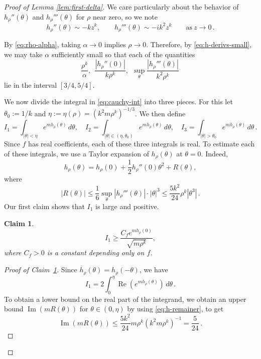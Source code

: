 \documentclass{daj}
\def\t{\theta}
\renewcommand{\Re}{\operatorname{Re}}
\renewcommand{\Im}{\operatorname{Im}}
\newtheorem{claim}[theorem]{Claim}
\theoremstyle{definition}
\theoremstyle{remark}
\begin{document}
\begin{proof}[Proof of Lemma \ref{lem:first-delta}]
	We care particularly about the behavior of $h_\rho''(\theta)$ and $h_\rho'''(\theta)$ for $\rho$ near zero, so we note \begin{equation} \label{eq:h-derivs-small}
	h_\rho''(\theta) \sim - k z^k,\qquad h_\rho'''(\theta) \sim -i k^2 z^k\qquad \mathrm{as}\ z \to 0\,.
	\end{equation}	
	
	By \eqref{eq:rho-alpha}, taking $\alpha \to 0$ implies $\rho \to 0$.  Therefore, by \eqref{eq:h-derivs-small}, we may take $\alpha$ sufficiently small so that each of 
	the quantities
	\begin{equation}\label{eq:h-derivs-bounds} 
	 \frac{\rho^k}{\alpha},\ \ \frac{|h_\rho''(0)|}{k \rho^k}, \ \ \sup_{\theta} \frac{|h_\rho'''(\theta)|}{k^2 \rho^k}\,
	\end{equation} lie in the interval $[3/4,5/4]$.
	

We now divide the integral in \eqref{eq:cauchy-int} into three pieces. For this let $\theta_0 := 1/k$ and $\eta := \eta(\rho) = (k^2 m \rho^k)^{-1/3}$. 
We then define 
	\begin{equation}
	I_1 = \int_{|\theta| < \eta} e^{m h_\rho(\theta)}\,d\theta,\quad I_2 = \int_{|\theta| \in (\eta,\theta_0)} e^{m h_\rho(\theta)}\,d\theta,\quad I_3 = \int_{|\theta| > \theta_0} e^{m h_\rho(\theta)}\,d\theta\,.
	\end{equation}  Since $f$ has real coefficients, each of these three integrals is real. 
To estimate each of these integrals, we use a Taylor expansion of $h_{\rho}(\t)$ at $\t = 0$. Indeed,
	 \begin{equation}\label{eq:h-taylor} h_\rho(\theta) = h_\rho(0) + \frac{1}{2}h_\rho''(0) \theta^2 + R(\theta) , \end{equation}
	where \begin{equation} \label{eq:h-remainer} |R(\theta)| \leq \frac{1}{6} \sup_{\theta} |h_\rho'''(\theta)| \cdot |\theta|^3 \leq  \frac{5 k^2 }{24} \rho^k |\theta^3|\,. \end{equation} Our first claim shows that $I_1$ is large and positive. 

\begin{claim} \label{claim:I1}
\[ I_1 \geq \frac{C_fe^{mh_{\rho}(0)}}{\sqrt{m\rho^k}}  , \]
where $C_f>0$ is a constant depending only on $f$. 
\end{claim}	
\begin{proof}[{Proof of Claim~\ref{claim:I1}}] Since $\overline{h}_\rho(\theta) = h_\rho(-\theta)$, 
we have \[ I_1 = 2 \int_0^\eta \Re (e^{m h_\rho(\theta)})\,d\theta\,.
\] To obtain a lower bound on the real part of the integrand, we obtain an upper bound $\Im (m R(\theta))$ for $\theta \in (0, \eta)$ by using \eqref{eq:h-remainer}, to get $$\Im(m R(\theta)) \leq \frac{5 k^2}{24}m \rho^k(k^2 m \rho^k)^{-1} = \frac{5}{24}\,.$$ 
	

\end{proof}
\end{proof}
\end{document}
